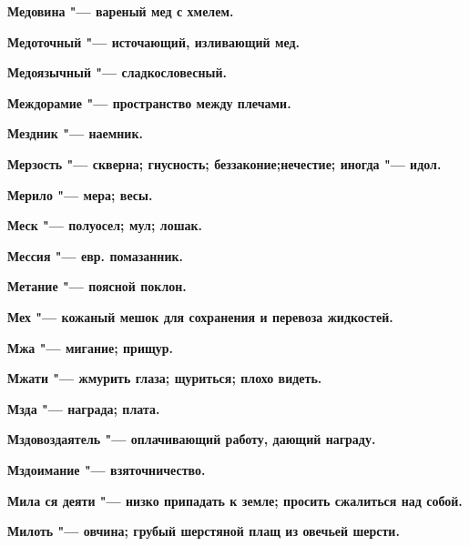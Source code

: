\begin{multicols}{2}
\bfseries Медовина\normalfont{} "--- вареный мед с хмелем. 




\bfseries Медоточный\normalfont{} "--- источающий, изливающий мед. 




\bfseries Медоязычный\normalfont{} "--- сладкословесный. 




\bfseries Междорамие\normalfont{} "--- пространство между плечами. 




\bfseries Мездник\normalfont{} "--- наемник. 




\bfseries Мерзость\normalfont{} "--- скверна; гнусность; беззаконие;нечестие; иногда "--- идол. 




\bfseries Мерило\normalfont{} "--- мера; весы. 




\bfseries Меск\normalfont{} "--- полуосел; мул; лошак. 




\bfseries Мессия\normalfont{} "--- евр. помазанник. 




\bfseries Метание\normalfont{} "--- поясной поклон. 




\bfseries Мех\normalfont{} "--- кожаный мешок для сохранения и перевоза жидкостей. 




\bfseries Мжа\normalfont{} "--- мигание; прищур. 




\bfseries Мжати\normalfont{} "--- жмурить глаза; щуриться; плохо видеть. 




\bfseries Мзда\normalfont{} "--- награда; плата. 




\bfseries Мздовоздаятель\normalfont{} "--- оплачивающий работу, дающий награду. 




\bfseries Мздоимание\normalfont{} "--- взяточничество. 




\bfseries Мила ся деяти\normalfont{} "--- низко припадать к земле; просить сжалиться над собой. 




\bfseries Милоть\normalfont{} "--- овчина; грубый шерстяной плащ из овечьей шерсти. 





\end{multicols}
